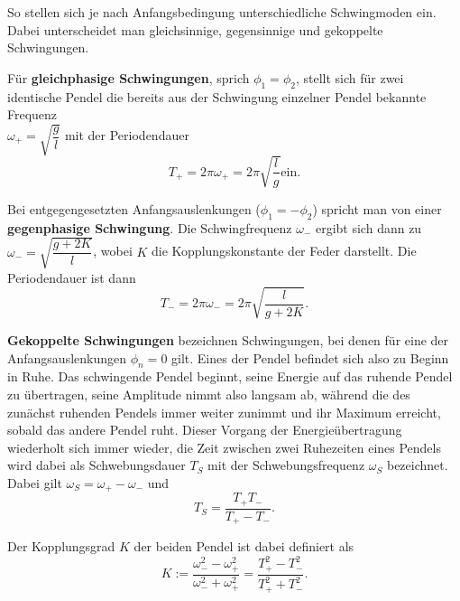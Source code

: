 So stellen sich je nach Anfangsbedingung unterschiedliche Schwingmoden ein. Dabei unterscheidet man gleichsinnige, gegensinnige und gekoppelte Schwingungen. \\

\newpage

Für \textbf{gleichphasige Schwingungen}, sprich $\phi_1=\phi_2$, stellt sich für zwei identische Pendel die bereits aus der Schwingung einzelner Pendel bekannte Frequenz \\ 
$\omega_+=\sqrt{\dfrac{g}{l}}$ mit der Periodendauer 
\begin{equation}
T_+ = 2\pi \omega_+ = 2\pi \sqrt{\dfrac{l}{g}} \text{ein.}
\label{eq:T_+}
\end{equation}

\noindent Bei entgegengesetzten Anfangsauslenkungen ($\phi_1=-\phi_2$) spricht man von einer \\ 
\textbf{gegenphasige Schwingung}. Die Schwingfrequenz $\omega_-$ ergibt sich dann zu \\
$\omega_- = \sqrt{\dfrac{g+2K}{l}}$, wobei $K$ die Kopplungskonstante der Feder darstellt.
Die Periodendauer ist dann 
\begin{equation}
    T_- = 2 \pi \omega_- = 2 \pi \sqrt{\dfrac{l}{g+2K}}\text{.}
\label{eq:T_-}
\end{equation}

\textbf{Gekoppelte Schwingungen} bezeichnen Schwingungen, bei denen für eine der Anfangsauslenkungen $\phi_n = 0$ gilt. Eines der Pendel befindet sich also zu Beginn in Ruhe.
Das schwingende Pendel beginnt, seine Energie auf das ruhende Pendel zu übertragen, seine Amplitude nimmt also langsam ab, während die des zunächst ruhenden Pendels immer weiter zunimmt und ihr Maximum erreicht, sobald das andere Pendel ruht.
Dieser Vorgang der Energieübertragung wiederholt sich immer wieder, die Zeit zwischen zwei Ruhezeiten eines Pendels wird dabei als Schwebungsdauer $T_S$ mit der Schwebungsfrequenz $\omega_S$ bezeichnet. \\
Dabei gilt $\omega_S= \omega_+ -\omega_-$ und
\begin{equation}
    T_S = \dfrac{T_+ T_-}{T_+ - T_-} \text{.}
\label{eq:T_S}
\end{equation}

\noindent Der Kopplungsgrad $K$ der beiden Pendel ist dabei definiert als
\begin{equation} 
    K := \dfrac{\omega_-^2-\omega_+^2}{\omega_-^2 + \omega_+^2} = \dfrac{T_+^2 - T_-^2}{T_+^2 + T_-^2} \text{.}
\label{eq:Kopplungsgrad}
\end{equation}



